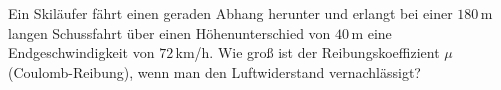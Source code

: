 \begin{ExerciseBlock}
Ein Skiläufer fährt einen geraden Abhang herunter und erlangt bei einer $180\,$m langen Schussfahrt über einen Höhenunterschied von $40\,$m eine Endgeschwindigkeit von $72\,$km/h. Wie groß ist der Reibungskoeffizient $\mu$ (Coulomb-Reibung), wenn man den Luftwiderstand vernachlässigt?
\end{ExerciseBlock}
